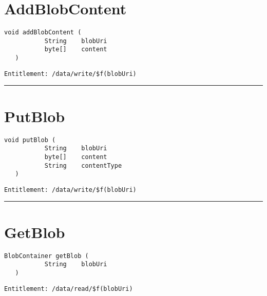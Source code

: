 \section{AddBlobContent}
\label{Api:AddBlobContent}
\begin{lstlisting}[style=nonumbers]
   void addBlobContent (
           String    blobUri
           byte[]    content
   )
\end{lstlisting}
\begin{Verbatim}[formatcom=\color{Maroon}]
  Entitlement: /data/write/$f(blobUri)
\end{Verbatim}



\rule{12cm}{2pt}
\section{PutBlob}
\label{Api:PutBlob}
\begin{lstlisting}[style=nonumbers]
   void putBlob (
           String    blobUri
           byte[]    content
           String    contentType
   )
\end{lstlisting}
\begin{Verbatim}[formatcom=\color{Maroon}]
  Entitlement: /data/write/$f(blobUri)
\end{Verbatim}



\rule{12cm}{2pt}
\section{GetBlob}
\label{Api:GetBlob}
\begin{lstlisting}[style=nonumbers]
   BlobContainer getBlob (
           String    blobUri
   )
\end{lstlisting}
\begin{Verbatim}[formatcom=\color{Maroon}]
  Entitlement: /data/read/$f(blobUri)
\end{Verbatim}



